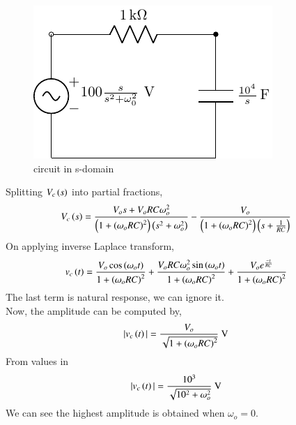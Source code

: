 \documentclass[journal,12pt,twocolumn]{IEEEtran}
\theoremstyle{remark}
\begin{document}
\begin{figure}[h!]
    \includegraphics[width = \columnwidth]{figs/c_fig2.pdf}
    \caption{circuit in s-domain }
    \centering
    \label{fig: bm_16_fig_2}
\end{figure}
Splitting $ V_c\left(s\right)$ into partial fractions,
\begin{align}
V_c\left(s\right) &= \frac{V_os + V_oRC\omega_o^2}{\left(1+\left(\omega_oRC\right)^2\right)\left(s^2+\omega_o^2\right)}-\frac{V_o}{\left(1+\left(\omega_oRC\right)^2\right)\left(s+\frac{1}{RC}\right)}
\end{align}
On applying inverse Laplace transform,
\begin{align}
v_c\left(t\right)&= \frac{V_o\cos{\ensuremath{\left(\omega_o t\right)}}}{1+\left(\omega_oRC\right)^2}+\frac{V_oRC\omega_o^2\sin{\ensuremath{\left(\omega_o t\right)}}}{1+\left(\omega_oRC\right)^2}+\frac{V_oe^{\frac{-t}{RC}}}{1+\left(\omega_oRC\right)^2}
\end{align}
\vspace{3cm}
The last term is natural response, we can ignore it.\\
Now, the amplitude can be computed by,
\begin{align}
|v_c\left(t\right)| &= \frac{V_o}{\sqrt{1+\left(\omega_oRC\right)^2}} \text{ V}
\end{align}
From values in 
\begin{align}
|v_c\left(t\right)| &= \frac{10^3}{\sqrt{10^2+\omega_o^2}} \text{ V}
\end{align}
We can see the highest amplitude is obtained when $ \omega_o = 0$.
\end{document}
